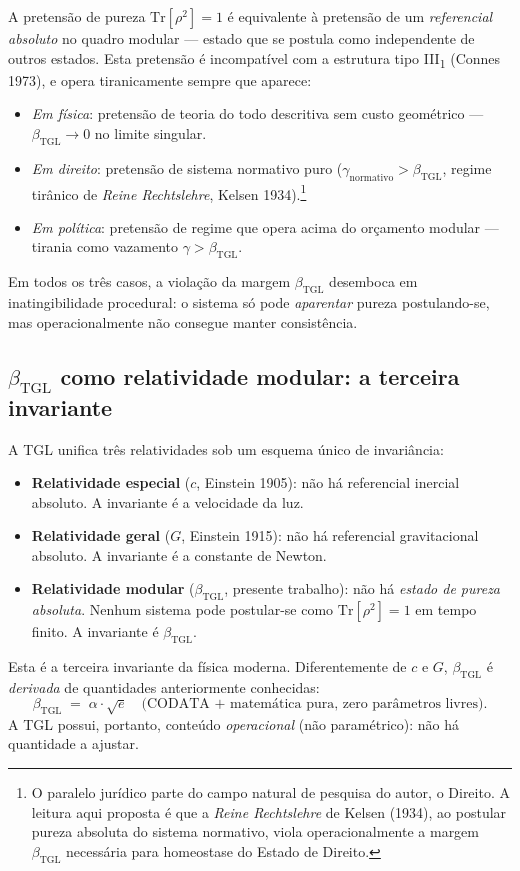 \documentclass[12pt,a4paper]{article}
\newcommand{\betatgl}{\beta_{\text{TGL}}}
\newcommand{\TGL}{\textsc{TGL}}
\begin{document}
A pretensão de pureza $\mathrm{Tr}[\rho^{2}] = 1$ é equivalente à pretensão
de um \emph{referencial absoluto} no quadro modular --- estado que se
postula como independente de outros estados.  Esta pretensão é
incompatível com a estrutura tipo III\textsubscript{1} (Connes 1973), e
opera tiranicamente sempre que aparece:
\begin{itemize}[leftmargin=*]
\item \emph{Em física}: pretensão de teoria do todo descritiva sem custo
geométrico --- $\betatgl \to 0$ no limite singular.
\item \emph{Em direito}: pretensão de sistema normativo puro
($\gamma_{\text{normativo}} > \betatgl$, regime tirânico de
\emph{Reine Rechtslehre}, Kelsen 1934).\footnote{O paralelo jurídico
parte do campo natural de pesquisa do autor, o Direito.  A leitura aqui
proposta é que a \emph{Reine Rechtslehre} de Kelsen (1934), ao postular
pureza absoluta do sistema normativo, viola operacionalmente a margem
$\betatgl$ necessária para homeostase do Estado de Direito.}
\item \emph{Em política}: pretensão de regime que opera acima do
orçamento modular --- tirania como vazamento $\gamma > \betatgl$.
\end{itemize}
Em todos os três casos, a violação da margem $\betatgl$ desemboca em
inatingibilidade procedural: o sistema só pode \emph{aparentar} pureza
postulando-se, mas operacionalmente não consegue manter consistência.

\subsection{$\betatgl$ como relatividade modular: a terceira invariante}
\label{subsec:rel-modular}

A \TGL{} unifica três relatividades sob um esquema único de invariância:
\begin{itemize}[leftmargin=*]
\item \textbf{Relatividade especial} ($c$, Einstein 1905): não há
referencial inercial absoluto.  A invariante é a velocidade da luz.
\item \textbf{Relatividade geral} ($G$, Einstein 1915): não há
referencial gravitacional absoluto.  A invariante é a constante de
Newton.
\item \textbf{Relatividade modular} ($\betatgl$, presente trabalho):
não há \emph{estado de pureza absoluta}.  Nenhum sistema pode
postular-se como $\mathrm{Tr}[\rho^{2}] = 1$ em tempo finito.  A
invariante é $\betatgl$.
\end{itemize}
Esta é a terceira invariante da física moderna.  Diferentemente de $c$
e $G$, $\betatgl$ é \emph{derivada} de quantidades anteriormente
conhecidas:
\begin{equation}
\betatgl \;=\; \alpha \cdot \sqrt{e}
\quad \text{(CODATA + matemática pura, zero parâmetros livres)}.
\end{equation}
A \TGL{} possui, portanto, conteúdo \emph{operacional} (não paramétrico):
não há quantidade a ajustar.
\end{document}

